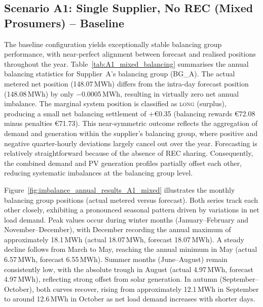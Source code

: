 \subsection{Scenario A1: Single Supplier, No REC (Mixed Prosumers) -- Baseline}
\label{sec:results_A1_mixed}

The baseline configuration yields exceptionally stable balancing group performance, with near-perfect alignment between forecast and realised positions throughout the year. Table~\ref{tab:A1_mixed_balancing} summarises the annual balancing statistics for Supplier~A's balancing group (BG\_A). The actual metered net position (148.07\,MWh) differs from the intra-day forecast position (148.08\,MWh) by only $-$0.0005\,MWh, resulting in virtually zero net annual imbalance. The marginal system position is classified as \textsc{long} (surplus), producing a small net balancing settlement of +\euro{}0.35 (balancing rewards \euro{}72.08 minus penalties \euro{}71.73). This near-symmetric outcome reflects the aggregation of demand and generation within the supplier's balancing group, where positive and negative quarter-hourly deviations largely cancel out over the year. Forecasting is relatively straightforward because of the absence of REC sharing. Consequently, the combined demand and PV generation profiles partially offset each other, reducing systematic imbalances at the balancing group level.

Figure~\ref{fig:imbalance_annual_results_A1_mixed} illustrates the monthly balancing group positions (actual metered versus forecast). Both series track each other closely, exhibiting a pronounced seasonal pattern driven by variations in net load demand. Peak values occur during winter months (January--February and November--December), with December recording the annual maximum of approximately 18.1\,MWh (actual 18.07\,MWh, forecast 18.07\,MWh). A steady decline follows from March to May, reaching the annual minimum in May (actual 6.57\,MWh, forecast 6.55\,MWh). Summer months (June--August) remain consistently low, with the absolute trough in August (actual 4.97\,MWh, forecast 4.97\,MWh), reflecting strong offset from solar generation. In autumn (September--October), both curves recover, rising from approximately 12.1\,MWh in September to around 12.6\,MWh in October as net load demand increases with shorter days.

